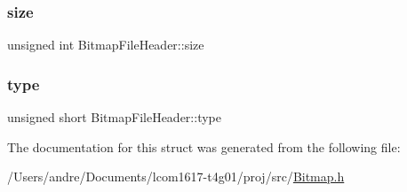 \hypertarget{struct_bitmap_file_header_a0dcad71d9b17783c4d296c2c6d00ede0}{}\label{struct_bitmap_file_header_a0dcad71d9b17783c4d296c2c6d00ede0} 
\subsubsection{\texorpdfstring{size}{size}}
{\footnotesize\ttfamily unsigned int Bitmap\+File\+Header\+::size}

\hypertarget{struct_bitmap_file_header_a139c2c2645bc00ddf4f5dc552872c1d1}{}\label{struct_bitmap_file_header_a139c2c2645bc00ddf4f5dc552872c1d1} 
\subsubsection{\texorpdfstring{type}{type}}
{\footnotesize\ttfamily unsigned short Bitmap\+File\+Header\+::type}



The documentation for this struct was generated from the following file\+:\begin{DoxyCompactItemize}
\item 
/\+Users/andre/\+Documents/lcom1617-\/t4g01/proj/src/\hyperlink{_bitmap_8h}{Bitmap.\+h}\end{DoxyCompactItemize}
